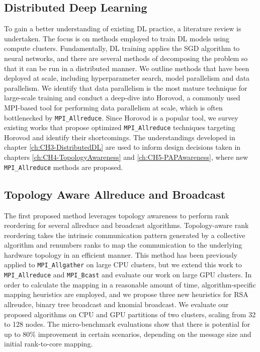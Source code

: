 \subsection{Distributed Deep Learning}
To gain a better understanding of existing \gls{DL} practice, a literature review is undertaken. 
The focus is on methods employed to train \gls{DL} models using compute clusters.
Fundamentally, \gls{DL} training applies the \gls{SGD} algorithm to neural networks, and there are several methods of decomposing the problem so that it can be run in a distributed manner. 
We outline methods that have been deployed at scale, including hyperparameter search, model parallelism and data parallelism.
We identify that data parallelism is the most mature technique for large-scale training and conduct a deep-dive into Horovod, a commonly used \gls{MPI}-based tool for performing data parallelism at scale, which is often bottlenecked by \texttt{MPI\_Allreduce}.
Since Horovod is a popular tool, we survey existing works that propose optimized \texttt{MPI\_Allreduce} techniques targeting Horovod and identify their shortcomings.
The understandings developed in chapter \ref{ch:CH3-DistributedDL} are used to inform design decisions taken in chapters \ref{ch:CH4-TopologyAwareness} and \ref{ch:CH5-PAPAwareness}, where new \texttt{MPI\_Allreduce} methods are proposed.

\subsection{Topology Aware Allreduce and Broadcast}
The first proposed method leverages topology awareness to perform rank reordering for several allreduce and broadcast algorithms.
Topology-aware rank reordering takes the intrinsic communication pattern generated by a collective algorithm and renumbers ranks to map the communication to the underlying hardware topology in an efficient manner.
This method has been previously applied to \texttt{MPI\_Allgather} on large \gls{CPU} clusters, but we extend this work to \texttt{MPI\_Allreduce} and \texttt{MPI\_Bcast} and evaluate our work on large \gls{GPU} clusters.
In order to calculate the mapping in a reasonable amount of time, algorithm-specific mapping heuristics are employed, and we propose three new heuristics for \gls{RSA} allreudce, binary tree broadcast and knomial broadcast.
We evaluate our proposed algorithms on \gls{CPU} and \gls{GPU} partitions of two clusters, scaling from 32 to 128 nodes.
The micro-benchmark evaluations show that there is potential for up to 80\% improvement in certain scenarios, depending on the message size and initial rank-to-core mapping.

